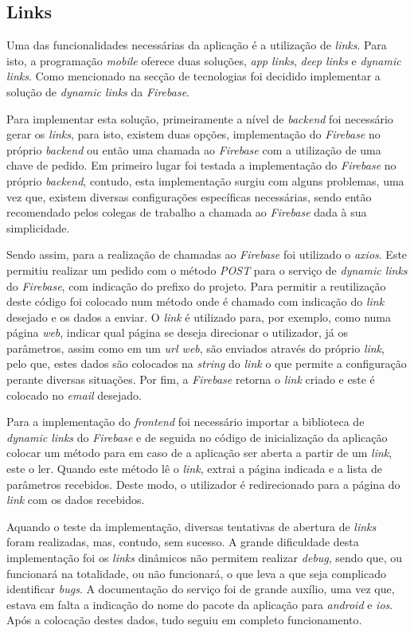 \subsection{Links}
Uma das funcionalidades necessárias da aplicação é a utilização de \textit{links}. Para isto, a programação \textit{mobile} oferece duas soluções, \textit{app links}, \textit{deep links} e \textit{dynamic links}. Como mencionado na secção de tecnologias foi decidido implementar a solução de \textit{dynamic links} da \textit{Firebase}.

Para implementar esta solução, primeiramente a nível de \textit{backend} foi necessário gerar os \textit{links}, para isto, existem duas opções, implementação do \textit{Firebase} no próprio \textit{backend} ou então uma chamada ao \textit{Firebase} com a utilização de uma chave de pedido. Em primeiro lugar foi testada a implementação do \textit{Firebase} no próprio \textit{backend}, contudo, esta implementação surgiu com alguns problemas, uma vez que, existem diversas configurações específicas necessárias, sendo então recomendado pelos colegas de trabalho a chamada ao \textit{Firebase} dada à sua simplicidade.

Sendo assim, para a realização de chamadas ao \textit{Firebase} foi utilizado o \textit{axios}. Este permitiu realizar um pedido com o método \textit{POST} para o serviço de \textit{dynamic links} do \textit{Firebase}, com indicação do prefixo do projeto. Para permitir a reutilização deste código foi colocado num método onde é chamado com indicação do \textit{link} desejado e os dados a enviar. O \textit{link} é utilizado para, por exemplo, como numa página \textit{web}, indicar qual página se deseja direcionar o utilizador, já os parâmetros, assim como em um \textit{url web}, são enviados através do próprio \textit{link}, pelo que, estes dados são colocados na \textit{string} do \textit{link} o que permite a configuração perante diversas situações. Por fim, a \textit{Firebase} retorna o \textit{link} criado e este é colocado no \textit{email} desejado.

Para a implementação do \textit{frontend} foi necessário importar a biblioteca de \textit{dynamic links} do \textit{Firebase} e de seguida no código de inicialização da aplicação colocar um método para em caso de a aplicação ser aberta a partir de um \textit{link}, este o ler. Quando este método lê o \textit{link}, extrai a página indicada e a lista de parâmetros recebidos. Deste modo, o utilizador é redirecionado para a página do \textit{link} com os dados recebidos.

Aquando o teste da implementação, diversas tentativas de abertura de \textit{links} foram realizadas, mas, contudo, sem sucesso. A grande dificuldade desta implementação foi os \textit{links} dinâmicos não permitem realizar \textit{debug}, sendo que, ou funcionará na totalidade, ou não funcionará, o que leva a que seja complicado identificar \textit{bugs}. A documentação do serviço foi de grande auxílio, uma vez que, estava em falta a indicação do nome do pacote da aplicação para \textit{android} e \textit{ios}. Após a colocação destes dados, tudo seguiu em completo funcionamento.